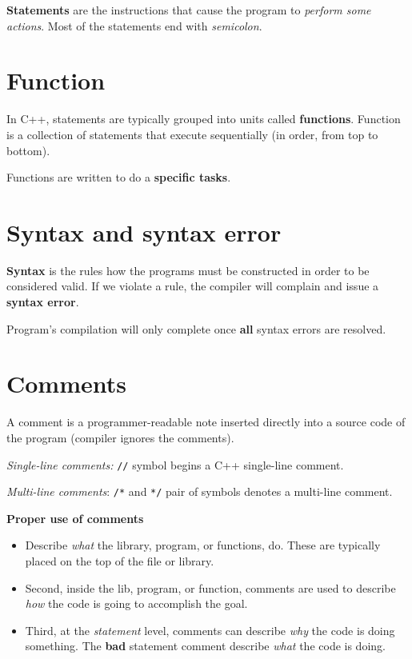 \documentclass[
  letterpaper,
  DIV=11,
  numbers=noendperiod]{scrreprt}
\begin{document}
\textbf{Statements} are the instructions that cause the program to
\emph{perform some actions}. Most of the statements end with
\emph{semicolon}.

\hypertarget{function}{%
\section{Function}\label{function}}

In C++, statements are typically grouped into units called
\textbf{functions}. Function is a collection of statements that execute
sequentially (in order, from top to bottom).

Functions are written to do a \textbf{specific tasks}.

\hypertarget{syntax-and-syntax-error}{%
\section{Syntax and syntax error}\label{syntax-and-syntax-error}}

\textbf{Syntax} is the rules how the programs must be constructed in
order to be considered valid. If we violate a rule, the compiler will
complain and issue a \textbf{syntax error}.

Program's compilation will only complete once \textbf{all} syntax errors
are resolved.

\hypertarget{comments}{%
\section{Comments}\label{comments}}

A comment is a programmer-readable note inserted directly into a source
code of the program (compiler ignores the comments).

\emph{Single-line comments:} \texttt{//} symbol begins a C++ single-line
comment.

\emph{Multi-line comments}: \texttt{/*} and \texttt{*/} pair of symbols
denotes a multi-line comment.

\textbf{Proper use of comments}

\begin{itemize}
\item
  Describe \emph{what} the library, program, or functions, do. These are
  typically placed on the top of the file or library.
\item
  Second, inside the lib, program, or function, comments are used to
  describe \emph{how} the code is going to accomplish the goal.
\item
  Third, at the \emph{statement} level, comments can describe \emph{why}
  the code is doing something. The \textbf{bad} statement comment
  describe \emph{what} the code is doing.
\end{itemize}
\end{document}
